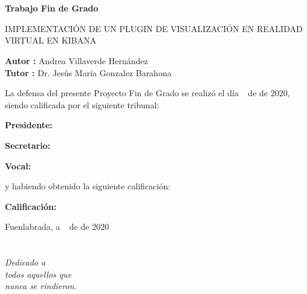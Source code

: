 \documentclass[a4paper, 12pt]{book}
\begin{document}
\newpage
\mbox{}
\thispagestyle{empty} %


\clearpage
{}
\chapter*{}

\vspace{-4cm}
\begin{center}
\large
\textbf{Trabajo Fin de Grado}

\vspace{1cm}
\large
IMPLEMENTACIÓN DE UN PLUGIN DE VISUALIZACIÓN EN REALIDAD VIRTUAL EN KIBANA

\vspace{1cm}
\large
\textbf{Autor :} Andrea Villaverde Hernández \\
\textbf{Tutor :} Dr. Jesús María Gonzalez Barahona

\end{center}

\vspace{1cm}
La defensa del presente Proyecto Fin de Grado se realizó el día \qquad$\;\,$ de \qquad\qquad\qquad\qquad \newline de 2020, siendo calificada por el siguiente tribunal:

\vspace{0.5cm}
\textbf{Presidente:}

\vspace{1.2cm}
\textbf{Secretario:}

\vspace{1.2cm}
\textbf{Vocal:}

\vspace{1.2cm}
y habiendo obtenido la siguiente calificación:

\vspace{1cm}
\textbf{Calificación:}


\vspace{1cm}
\begin{flushright}
Fuenlabrada, a \qquad$\;\,$ de \qquad\qquad\qquad\qquad de 2020
\end{flushright}


\chapter*{}
\begin{flushright}
\textit{Dedicado a \\ 
todos aquellos que \\
nunca se rindieron.}
\end{flushright}
\end{document}
